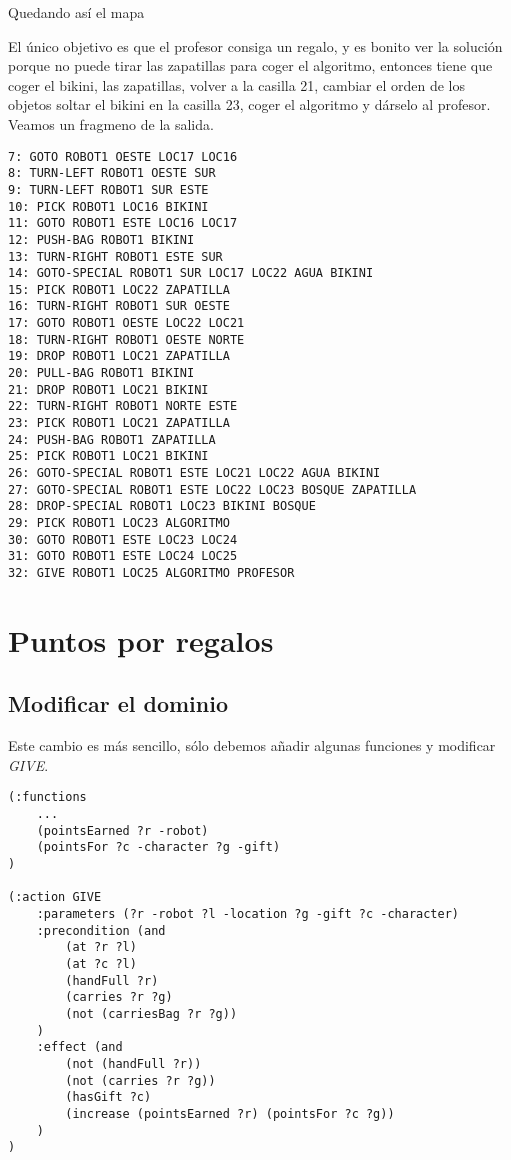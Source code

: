 \documentclass{article}
\newcommand{\img}[1]{
\noindent\makebox[0.9\textwidth][c]{\texttt{[image: \#1]}}%
}
\begin{document}
Quedando así el mapa

\img{img/map3}

El único objetivo es que el profesor consiga un regalo, y es bonito ver la solución porque no puede tirar las zapatillas para coger el algoritmo, entonces tiene que coger el bikini, las zapatillas, volver a la casilla 21, cambiar el orden de los objetos soltar el bikini en la casilla 23, coger el algoritmo y dárselo al profesor. Veamos un fragmeno de la salida.

\begin{lstlisting}
7: GOTO ROBOT1 OESTE LOC17 LOC16
8: TURN-LEFT ROBOT1 OESTE SUR
9: TURN-LEFT ROBOT1 SUR ESTE
10: PICK ROBOT1 LOC16 BIKINI
11: GOTO ROBOT1 ESTE LOC16 LOC17
12: PUSH-BAG ROBOT1 BIKINI
13: TURN-RIGHT ROBOT1 ESTE SUR
14: GOTO-SPECIAL ROBOT1 SUR LOC17 LOC22 AGUA BIKINI
15: PICK ROBOT1 LOC22 ZAPATILLA
16: TURN-RIGHT ROBOT1 SUR OESTE
17: GOTO ROBOT1 OESTE LOC22 LOC21
18: TURN-RIGHT ROBOT1 OESTE NORTE
19: DROP ROBOT1 LOC21 ZAPATILLA
20: PULL-BAG ROBOT1 BIKINI
21: DROP ROBOT1 LOC21 BIKINI
22: TURN-RIGHT ROBOT1 NORTE ESTE
23: PICK ROBOT1 LOC21 ZAPATILLA
24: PUSH-BAG ROBOT1 ZAPATILLA
25: PICK ROBOT1 LOC21 BIKINI
26: GOTO-SPECIAL ROBOT1 ESTE LOC21 LOC22 AGUA BIKINI
27: GOTO-SPECIAL ROBOT1 ESTE LOC22 LOC23 BOSQUE ZAPATILLA
28: DROP-SPECIAL ROBOT1 LOC23 BIKINI BOSQUE
29: PICK ROBOT1 LOC23 ALGORITMO
30: GOTO ROBOT1 ESTE LOC23 LOC24
31: GOTO ROBOT1 ESTE LOC24 LOC25
32: GIVE ROBOT1 LOC25 ALGORITMO PROFESOR
\end{lstlisting}

\section{Puntos por regalos}
\subsection{Modificar el dominio}

Este cambio es más sencillo, sólo debemos añadir algunas funciones y modificar \emph{GIVE}.

\begin{lstlisting}
(:functions
    ...
    (pointsEarned ?r -robot)
    (pointsFor ?c -character ?g -gift)
)

(:action GIVE
    :parameters (?r -robot ?l -location ?g -gift ?c -character)
    :precondition (and 
        (at ?r ?l)
        (at ?c ?l)
        (handFull ?r)
        (carries ?r ?g)
        (not (carriesBag ?r ?g))
    )
    :effect (and 
        (not (handFull ?r))
        (not (carries ?r ?g))
        (hasGift ?c)
        (increase (pointsEarned ?r) (pointsFor ?c ?g))
    )
)
\end{lstlisting}
\end{document}
